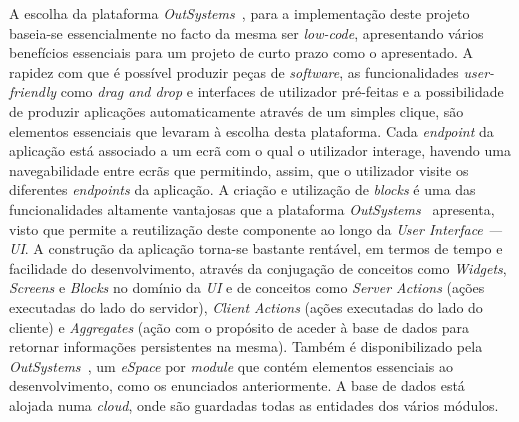 A escolha da plataforma \textit{OutSystems~\cite{outsystems}}, para a implementação deste projeto baseia-se essencialmente no facto da mesma ser \textit{low-code},
apresentando vários benefícios essenciais para um projeto de curto prazo como o apresentado. A rapidez
com que é possível produzir peças de \textit{software}, as funcionalidades \textit{user-friendly} como \textit{drag and drop} e 
interfaces de utilizador pré-feitas e a possibilidade de produzir aplicações automaticamente através de
um simples clique, são elementos essenciais que levaram à escolha desta plataforma. 
Cada \textit{endpoint} da aplicação está associado a um ecrã com o qual o utilizador interage, havendo uma navegabilidade entre ecrãs que permitindo, assim,
 que o utilizador visite os diferentes \textit{endpoints} da aplicação.
A criação e utilização de \textit{blocks} é uma das funcionalidades altamente vantajosas que a plataforma \textit{OutSystems~\cite{outsystems}} apresenta, 
visto que permite a reutilização deste componente ao longo da \textit{User Interface --- UI}.
A construção da aplicação torna-se bastante rentável, em termos de tempo e facilidade do desenvolvimento, 
através da conjugação de conceitos como \textit{Widgets}, \textit{Screens} e \textit{Blocks} no domínio da  \textit{UI} 
e de conceitos como \textit{Server Actions} (ações executadas do lado do servidor), \textit{Client Actions} (ações executadas do lado do cliente) 
e \textit{Aggregates} (ação com o propósito de aceder à base de dados para retornar informações persistentes na mesma).
Também é disponibilizado pela \textit{OutSystems~\cite{outsystems}}, um \textit{eSpace} por \textit{module} que contém elementos essenciais 
ao desenvolvimento, como os enunciados anteriormente.
A base de dados está alojada numa \textit{cloud}, onde são guardadas todas as entidades dos vários módulos.


